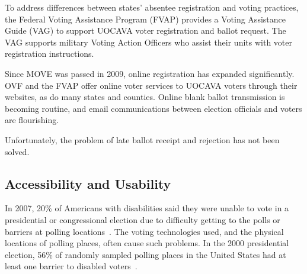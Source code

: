 

To address differences between states' absentee registration and
voting practices, the Federal Voting Assistance Program (FVAP)
provides a Voting Assistance Guide (VAG) to support UOCAVA voter
registration and ballot request. The VAG supports military Voting
Action Officers who assist their units with voter registration
instructions. 

Since MOVE was passed in 2009, online registration has expanded
significantly. OVF and the FVAP offer online voter services to UOCAVA
voters through their websites, as do many states and counties. Online
blank ballot transmission is becoming routine, and email
communications between election officials and voters are flourishing.

Unfortunately, the problem of late ballot receipt and rejection has
not been solved.


\subsection{Accessibility and Usability}

In 2007, 20\% of Americans with disabilities said they were unable to
vote in a presidential or congressional election due to difficulty
getting to the polls or barriers at polling
locations~\cite{runyan2007improving}. The voting technologies used,
and the physical locations of polling places, often cause such
problems. In the 2000 presidential election, 56\% of randomly sampled
polling places in the United States had at least one barrier to
disabled voters~\cite{united2001voters}.

